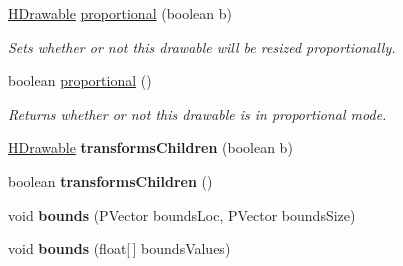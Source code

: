 \begin{DoxyCompactItemize}
\hyperlink{classhype_1_1core_1_1drawable_1_1_h_drawable}{H\-Drawable} \hyperlink{classhype_1_1core_1_1drawable_1_1_h_drawable_ae4497942c7fbf1112bb8e557ec72aad8}{proportional} (boolean b)
\begin{DoxyCompactList}\small\item\em Sets whether or not this drawable will be resized proportionally. \end{DoxyCompactList}\item 
boolean \hyperlink{classhype_1_1core_1_1drawable_1_1_h_drawable_a220999f7d54e04a47ad0509d349a2bdd}{proportional} ()
\begin{DoxyCompactList}\small\item\em Returns whether or not this drawable is in proportional mode. \end{DoxyCompactList}\item 
\hypertarget{classhype_1_1core_1_1drawable_1_1_h_drawable_ad3732f860b758f7cdd3b054c6316bb63}{\hyperlink{classhype_1_1core_1_1drawable_1_1_h_drawable}{H\-Drawable} {\bfseries transforms\-Children} (boolean b)}\label{classhype_1_1core_1_1drawable_1_1_h_drawable_ad3732f860b758f7cdd3b054c6316bb63}

\item 
\hypertarget{classhype_1_1core_1_1drawable_1_1_h_drawable_a15ac4680ab74bf0204aaf6386745f5fd}{boolean {\bfseries transforms\-Children} ()}\label{classhype_1_1core_1_1drawable_1_1_h_drawable_a15ac4680ab74bf0204aaf6386745f5fd}

\item 
\hypertarget{classhype_1_1core_1_1drawable_1_1_h_drawable_a639d7623e011c4e720a3ab90ab3552a7}{void {\bfseries bounds} (P\-Vector bounds\-Loc, P\-Vector bounds\-Size)}\label{classhype_1_1core_1_1drawable_1_1_h_drawable_a639d7623e011c4e720a3ab90ab3552a7}

\item 
\hypertarget{classhype_1_1core_1_1drawable_1_1_h_drawable_a0edd0e321438b3683b993eabccb702d9}{void {\bfseries bounds} (float\mbox{[}$\,$\mbox{]} bounds\-Values)}\label{classhype_1_1core_1_1drawable_1_1_h_drawable_a0edd0e321438b3683b993eabccb702d9}


\end{DoxyCompactItemize}
